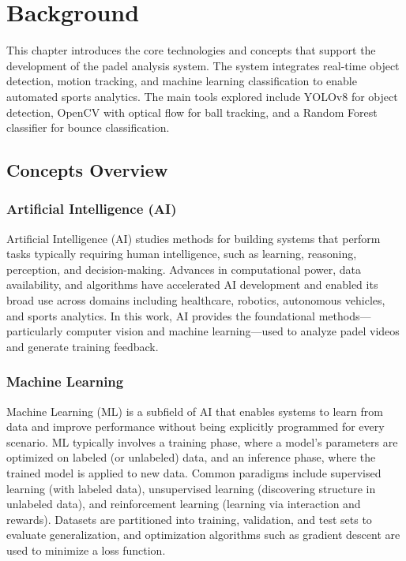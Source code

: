 \chapter{Background}\label{chap:background}
This chapter introduces the core technologies and concepts that support the development of the padel analysis system. The system integrates real-time object detection, motion tracking, and machine learning classification to enable automated sports analytics. The main tools explored include YOLOv8 for object detection, OpenCV with optical flow for ball tracking, and a Random Forest classifier for bounce classification.

\section{Concepts Overview} \label{sec:s1}

\subsection{Artificial Intelligence (AI)}

Artificial Intelligence (AI) studies methods for building systems that perform tasks typically requiring human intelligence, such as learning, reasoning, perception, and decision-making. Advances in computational power, data availability, and algorithms have accelerated AI development and enabled its broad use across domains including healthcare, robotics, autonomous vehicles, and sports analytics. In this work, AI provides the foundational methods—particularly computer vision and machine learning—used to analyze padel videos and generate training feedback.

\subsection{Machine Learning}

Machine Learning (ML) is a subfield of AI that enables systems to learn from data and improve performance without being explicitly programmed for every scenario. ML typically involves a training phase, where a model's parameters are optimized on labeled (or unlabeled) data, and an inference phase, where the trained model is applied to new data. Common paradigms include supervised learning (with labeled data), unsupervised learning (discovering structure in unlabeled data), and reinforcement learning (learning via interaction and rewards). Datasets are partitioned into training, validation, and test sets to evaluate generalization, and optimization algorithms such as gradient descent are used to minimize a loss function.


